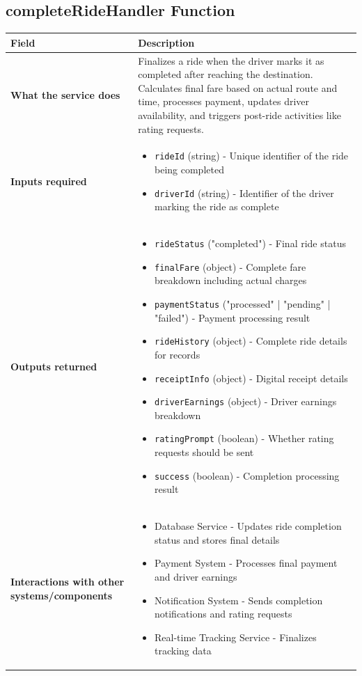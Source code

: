 \documentclass[11pt,a4paper]{article}
\begin{document}
\subsection{completeRideHandler Function}

\begin{longtable}{|p{4cm}|p{12cm}|}
\hline
\textbf{Field} & \textbf{Description} \\
\hline
\textbf{What the service does} & 
Finalizes a ride when the driver marks it as completed after reaching the destination. Calculates final fare based on actual route and time, processes payment, updates driver availability, and triggers post-ride activities like rating requests. \\
\hline
\textbf{Inputs required} & 
\begin{itemize}[nosep]
\item \texttt{rideId} (string) - Unique identifier of the ride being completed
\item \texttt{driverId} (string) - Identifier of the driver marking the ride as complete
\end{itemize} \\
\hline
\textbf{Outputs returned} & 
\begin{itemize}[nosep]
\item \texttt{rideStatus} ("completed") - Final ride status
\item \texttt{finalFare} (object) - Complete fare breakdown including actual charges
\item \texttt{paymentStatus} ("processed" | "pending" | "failed") - Payment processing result
\item \texttt{rideHistory} (object) - Complete ride details for records
\item \texttt{receiptInfo} (object) - Digital receipt details
\item \texttt{driverEarnings} (object) - Driver earnings breakdown
\item \texttt{ratingPrompt} (boolean) - Whether rating requests should be sent
\item \texttt{success} (boolean) - Completion processing result
\end{itemize} \\
\hline
\textbf{Interactions with other systems/components} & 
\begin{itemize}[nosep]
\item Database Service - Updates ride completion status and stores final details
\item Payment System - Processes final payment and driver earnings
\item Notification System - Sends completion notifications and rating requests
\item Real-time Tracking Service - Finalizes tracking data
\end{itemize} \\
\hline
\end{longtable}
\end{document}
